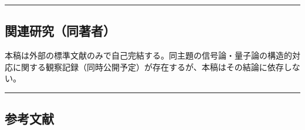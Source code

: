 \documentclass[
]{ltjsarticle}
\begin{document}
\begin{center}\rule{0.5\linewidth}{0.5pt}\end{center}

\subsection{関連研究（同著者）}\label{ux95a2ux9023ux7814ux7a76ux540cux8457ux8005}

本稿は外部の標準文献のみで自己完結する。同主題の信号論・量子論の構造的対応に関する観察記録（同時公開予定）が存在するが、本稿はその結論に依存しない。

\begin{center}\rule{0.5\linewidth}{0.5pt}\end{center}

\subsection{参考文献}\label{ux53c2ux8003ux6587ux732e}
\end{document}

